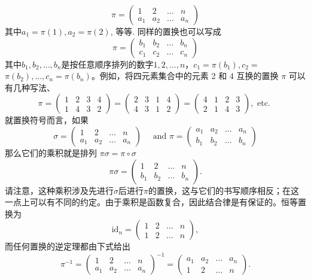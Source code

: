 \[\pi=\begin{pmatrix}1&2&\dots&n\\a_1&a_2&\dots&a_n\end{pmatrix}\]
其中$a_1=\pi(1),a_2=\pi(2)$, 等等. 同样的置换也可以写成
$$
\pi=\left(\begin{array}{llll}
b_1 & b_2 & \ldots & b_n \\
c_1 & c_2 & \ldots & c_n
\end{array}\right)
$$
其中$b_1, b_2, \ldots,b_n$是按任意顺序排列的数字$1,2, \ldots,n$，$c_1=\pi\left(b_1\right), c_2=$ $\pi\left(b_2\right), \ldots,c_n=\pi\left(b_n\right)$。例如，将四元素集合中的元素 2 和 4 互换的置换 $\pi$ 可以有几种写法、
$$
\pi=\left(\begin{array}{llll}
1 & 2 & 3 & 4 \\
1 & 4 & 3 & 2
\end{array}\right)=\left(\begin{array}{llll}
2 & 3 & 1 & 4 \\
4 & 3 & 1 & 2
\end{array}\right)=\left(\begin{array}{llll}
4 & 1 & 2 & 3 \\
2 & 1 & 4 & 3
\end{array}\right), \text { etc. }
$$
就置换符号而言，如果
$$
\sigma=\left(\begin{array}{cccc}
1 & 2 & \ldots & n \\
a_1 & a_2 & \ldots & a_n
\end{array}\right) \quad \text { and } \pi=\left(\begin{array}{cccc}
a_1 & a_2 & \ldots & a_n \\
b_1 & b_2 & \ldots & b_n
\end{array}\right)
$$
那么它们的乘积就是排列 $\pi \sigma=\pi \circ \sigma$
$$
\pi \sigma=\left(\begin{array}{cccc}
1 & 2 & \ldots & n \\
b_1 & b_2 & \ldots & b_n
\end{array}\right) .
$$
请注意，这种乘积涉及先进行$\sigma$后进行$\pi$的置换，这与它们的书写顺序相反；在这一点上可以有不同的约定。由于乘积是函数复合，因此结合律是有保证的。恒等置换为
$$
\mathrm{id}_n=\left(\begin{array}{llll}
1 & 2 & \ldots & n \\
1 & 2 & \ldots & n
\end{array}\right),
$$
而任何置换的逆定理都由下式给出
$$
\pi^{-1}=\left(\begin{array}{cccc}
1 & 2 & \ldots & n \\
a_1 & a_2 & \ldots & a_n
\end{array}\right)^{-1}=\left(\begin{array}{cccc}
a_1 & a_2 & \ldots & a_n \\
1 & 2 & \ldots & n
\end{array}\right) .
$$

